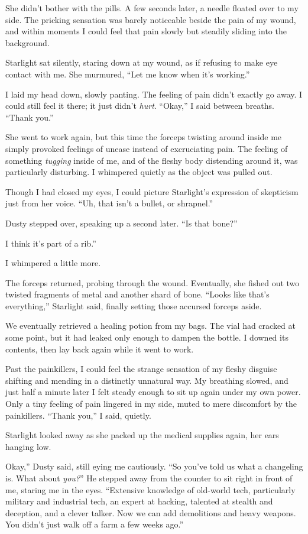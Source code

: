 She didn’t bother with the pills. A few seconds later, a needle floated over to my side. The pricking sensation was barely noticeable beside the pain of my wound, and within moments I could feel that pain slowly but steadily sliding into the background.

Starlight sat silently, staring down at my wound, as if refusing to make eye contact with me. She murmured, “Let me know when it’s working.”

I laid my head down, slowly panting. The feeling of pain didn’t exactly go away. I could still feel it there; it just didn’t \textit{hurt}. “Okay,” I said between breaths. “Thank you.”

She went to work again, but this time the forceps twisting around inside me simply provoked feelings of unease instead of excruciating pain. The feeling of something \textit{tugging} inside of me, and of the fleshy body distending around it, was particularly disturbing. I whimpered quietly as the object was pulled out.

Though I had closed my eyes, I could picture Starlight’s expression of skepticism just from her voice. “Uh, that isn’t a bullet, or shrapnel.”

Dusty stepped over, speaking up a second later. “Is that bone?”

\leavevmode{}I think it’s part of a rib.”

I whimpered a little more.

The forceps returned, probing through the wound. Eventually, she fished out two twisted fragments of metal and another shard of bone. “Looks like that’s everything,” Starlight said, finally setting those accursed forceps aside.

We eventually retrieved a healing potion from my bags. The vial had cracked at some point, but it had leaked only enough to dampen the bottle. I downed its contents, then lay back again while it went to work.

Past the painkillers, I could feel the strange sensation of my fleshy disguise shifting and mending in a distinctly unnatural way. My breathing slowed, and just half a minute later I felt steady enough to sit up again under my own power. Only a tiny feeling of pain lingered in my side, muted to mere discomfort by the painkillers. “Thank you,” I said, quietly.

Starlight looked away as she packed up the medical supplies again, her ears hanging low.

\leavevmode{}Okay,” Dusty said, still eying me cautiously. “So you’ve told us what a changeling is. What about \textit{you?}” He stepped away from the counter to sit right in front of me, staring me in the eyes. “Extensive knowledge of old-world tech, particularly military and industrial tech, an expert at hacking, talented at stealth and deception, and a clever talker. Now we can add demolitions and heavy weapons. You didn’t just walk off a farm a few weeks ago.”

